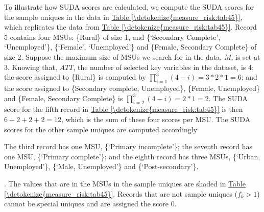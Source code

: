 \documentclass[letterpaper,10pt,english]{sphinxmanual}
\begin{document}

To illustrate how SUDA scores are calculated, we compute the SUDA scores
for the sample uniques in the data in \hyperref[\detokenize{measure_risk:tab45}]{Table \ref{\detokenize{measure_risk:tab45}}}, which replicates the
data from \hyperref[\detokenize{measure_risk:tab45}]{Table \ref{\detokenize{measure_risk:tab45}}}. Record 5 contains four MSUs: \{Rural\} of size 1, and
\{‘Secondary Complete’, ‘Unemployed’\}, \{‘Female’, ‘Unemployed’\} and
\{Female, Secondary Complete\} of size 2. Suppose the maximum size of MSUs
we search for in the data, \(M\), is set at 3. Knowing that,
\(ATT\), the number of selected key variables in the dataset,
is 4; the score assigned to \{Rural\} is computed by
\(\prod_{i = 1}^{3}{(4 - i)} = 3*2*1 = 6\); and the score assigned
to \{Secondary complete, Unemployed\}, \{Female, Unemployed\} and \{Female,
Secondary Complete\} is
\(\prod_{i = 2}^{3}\left( 4 - i \right) = 2*1 = 2\). The SUDA score
for the fifth record in \hyperref[\detokenize{measure_risk:tab45}]{Table \ref{\detokenize{measure_risk:tab45}}} is then \(6 + 2 + 2 + 2 = 12\),
which is the sum of these four scores per MSU. The SUDA scores for the
other sample uniques are computed accordingly %
\begin{footnote}[13]\sphinxAtStartFootnote
The third record has one MSU, \{‘Primary incomplete’\}; the seventh
record has one MSU, \{‘Primary complete’\}; and the eighth record has
three MSUs, \{‘Urban, Unemployed’\}, \{‘Male, Unemployed’\} and
\{‘Post-secondary’\}.
%
\end{footnote}. The
values that are in the MSUs in the sample uniques are shaded in \hyperref[\detokenize{measure_risk:tab45}]{Table \ref{\detokenize{measure_risk:tab45}}}.
Records that are not sample uniques (\(f_{k} > 1\)) cannot be
special uniques and are assigned the score 0.
\end{document}
